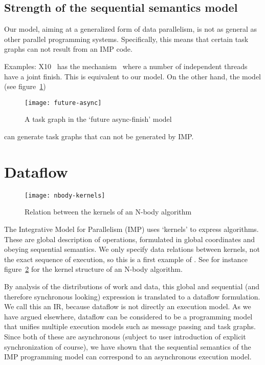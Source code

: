 \documentclass[11pt,fleqn,preprint]{impreport}
\begin{document}
\subsection{Strength of the sequential semantics model}

Our model, aiming at a generalized form of data parallelism, is not as
general as other parallel programming systems. Specifically, this
means that certain task graphs can not result from an IMP code.

Examples: X10~\cite{Charles:2005:X10} has the 
mechanism~\cite{Lee:2010:X10-finish} where a number of independent
threads have a joint finish. This is equivalent to our model. On the
other hand, the  model (see
figure~\ref{fig:future-async})
%
\begin{figure}
  \texttt{[image: future-async]}
  \caption{A task graph in the `future async-finish' model}
  \label{fig:future-async}
\end{figure}
%
can generate task graphs that can not be generated by \ac{IMP}.

\section{Dataflow}

\begin{figure}[ht]
  \texttt{[image: nbody-kernels]}
  \caption{Relation between the kernels of an N-body algorithm}
  \label{fig:nbody-flow}
\end{figure}

The Integrative Model for Parallelism (IMP) uses `kernels' to express algorithms.
These are global description of operations, formulated in global coordinates and 
obeying sequential semantics. We only specify data relations between
kernels, not the exact sequence of execution, so this is a first
example of . See for instance
figure~\ref{fig:nbody-flow} for the kernel structure of an N-body algorithm.

By analysis of the distributions of work and data, this global and sequential
(and therefore synchronous looking) expression is translated to a dataflow
formulation.
We call this an \acf{IR}, because dataflow is not directly
an execution model. As we have argued elsewhere, dataflow can be considered to be
a programming model that unifies multiple execution models such as message passing 
and task graphs. Since both of these are asynchronous (subject to user introduction
of explicit synchronization of course), we have shown that the sequential semantics
of the IMP programming model can correspond to an asynchronous execution model.
\end{document}
